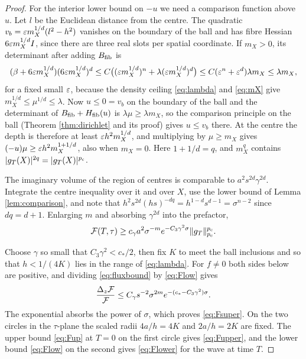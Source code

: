 \begin{proof}
For the interior lower bound on $-u$ we need a comparison function above $u$. Let $l$ be the
Euclidean distance from the centre. The quadratic $v_b=\varepsilon m_X^{1/d}(l^2-h^2)$ vanishes on the
boundary of the ball and has fibre Hessian $6\varepsilon m_X^{1/d}I$, since there are three real slots
per spatial coordinate. If $m_X>0$, its determinant after adding $B_{\rm fib}$ is
\[
(\beta+6\varepsilon m_X^{1/d})(6\varepsilon m_X^{1/d})^d\le C\bigl((\varepsilon m_X^{1/d})^n+\lambda(\varepsilon m_X^{1/d})^d\bigr)
\le C(\varepsilon^n+\varepsilon^d)\lambda m_X\le\lambda m_X ,
\]
for a fixed small $\varepsilon$, because the density ceiling \eqref{eq:lambda} and \eqref{eq:mX} give
$m_X^{1/d}\le\mu^{1/d}\le\lambda$. Now $u\le0=v_b$ on the boundary of the ball and the
determinant of $B_{\rm fib}+H_{\mathrm{fib}}(u)$ is $\lambda\mu\ge\lambda m_X$, so the comparison principle on
the ball (Theorem \ref{thm:dirichlet} and its proof) gives $u\le v_b$ there. At the centre the
depth is therefore at least $\varepsilon h^2m_X^{1/d}$, and multiplying by $\mu\ge m_X$ gives
$(-u)\mu\ge\varepsilon h^2m_X^{1+1/d}$, also when $m_X=0$. Here $1+1/d=q$, and $m_X^q$ contains
$|g_T(X)|^{2q}=|g_T(X)|^{p_{\mathrm c}}$.

The imaginary volume of the region of centres is comparable to $a^2s^{2d}\gamma^{2d}$. Integrate
the centre inequality over it and over $X$, use the lower bound of Lemma \ref{lem:comparison}, and
note that $h^2s^{2d}(hs)^{-dq}=h^{1-d}s^{d-1}=\sigma^{n-2}$ since $dq=d+1$. Enlarging $m$ and
absorbing $\gamma^{2d}$ into the prefactor,
\begin{equation}\label{eq:Flow}
\mathcal F(T,\tau)\ge c_\gamma a^2\sigma^{-m}e^{-C_3\gamma^2\sigma}\|g_T\|_{p_{\mathrm c}}^{p_{\mathrm c}}.
\end{equation}

Choose $\gamma$ so small that $C_3\gamma^2<c_*/2$, then fix $K$ to meet the ball inclusions and so
that $h<1/(4K)$ lies in the range of \eqref{eq:lambda}. For $f\ne0$ both sides below are positive,
and dividing \eqref{eq:fluxbound} by \eqref{eq:Flow} gives
\[
\frac{\Delta_z\mathcal F}{\mathcal F}\le C_\gamma s^{-2}\sigma^{2m}e^{-(c_*-C_3\gamma^2)\sigma}.
\]
The exponential absorbs the power of $\sigma$, which proves \eqref{eq:Fsuper}. On the two circles
in the $\tau$-plane the scaled radii $4a/h=4K$ and $2a/h=2K$ are fixed. The upper bound
\eqref{eq:Fup} at $T=0$ on the first circle gives \eqref{eq:Fupper}, and the lower bound
\eqref{eq:Flow} on the second gives \eqref{eq:Flower} for the wave at time $T$.
\end{proof}
